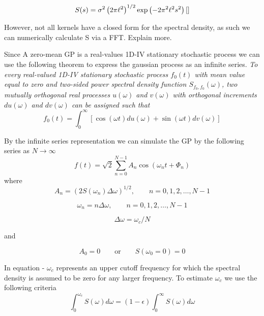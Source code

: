 \documentclass[../main.tex]{subfiles}
\begin{document}
$$
S(s) = \sigma^2 \left( 2 \pi \ell^2 \right)^{1/2}\exp \left( -2 \pi^2 \ell^2 s^2 \right) \cite{}
$$

However, not all kernels have a closed form for the spectral density, as such we can numerically calculate S via a FFT. Explain more. 


Since A zero-mean GP is a real-values 1D-IV stationary stochastic process we can use the following theorem to express the gaussian process as an infinite series. 
{\it To every real-valued 1D-IV stationary stochastic process $f_0(t)$ with mean value equal to zero and two-sided power spectral density function $S_{f_0,f_0}(\omega)$, two mutually orthogonal real processes $u(\omega)$ and $v(\omega)$ with orthogonal increments $du(\omega)$ and $dv(\omega)$ can be assigned such that
$$
f_0(t) = \int^\infty_0 \left[\cos (\omega t)du(\omega) + \sin (\omega t)dv(\omega)  \right]
$$}



By the infinite series representation we can simulate the GP by the following series as $N \rightarrow \infty$
$$
f(t) = \sqrt{2}\sum^{N-1}_{n=0} A_n \cos(\omega_n t + \Phi_n)
$$
where
$$
A_n = \left( 2 S(\omega_n) \Delta \omega \right)^{1/2}, \qquad n=0,1,2,\dots,N-1
$$

$$
\omega_n = n\Delta \omega , \qquad n=0,1,2,\dots,N-1
$$

$$
\Delta \omega = \omega_c / N
$$

and

$$
A_0 = 0 \qquad \text{or} \qquad S(\omega_0 = 0) =0
$$

In equation - $\omega_c$ represents an upper cutoff frequency for which the spectral density is assumed to be zero for any larger frequency. To estimate $\omega_c$ we use the following criteria 
$$
\int^{\omega_c}_0 S(\omega) d\omega = \left( 1 - \epsilon \right) \int^{\infty}_0 S(\omega) d\omega
$$
\end{document}
